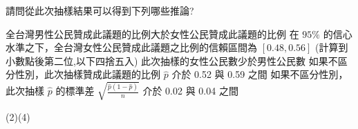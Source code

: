 \begin{QUESTIONS}
\begin{QUESTION}
\begin{QBODY}
			請問從此次抽樣結果可以得到下列哪些推論?

			\begin{QOPS} 
				\QOP 全台灣男性公民贊成此議題的比例大於女性公民贊成此議題的比例
				\QOP 在 $95\%$ 的信心水準之下，全台灣女性公民贊成此議題之比例的信賴區間為
			$[0.48,0.56]$ (計算到小數點後第二位,以下四捨五入)
				\QOP 此次抽樣的女性公民數少於男性公民數
				\QOP 如果不區分性別，此次抽樣贊成此議題的比例 $\hat{p}$ 介於 0.52 與 0.59 之間
				\QOP 如果不區分性別，此次抽樣 $\hat{p}$ 的標準差 $\sqrt{\frac{\hat{p}(1-\hat{p})}{n}}$ 介於 0.02 與 0.04 之間
			\end{QOPS}
        \end{QBODY}
        \begin{QFROMS}
        \end{QFROMS}
        \begin{QTAGS}\end{QTAGS}
        \begin{QANS}
            (2)(4)
        \end{QANS}
        \begin{QSOLLIST}
        \end{QSOLLIST}
        \begin{QEMPTYSPACE}
        \end{QEMPTYSPACE}
    \end{QUESTION}
\end{QUESTIONS}
